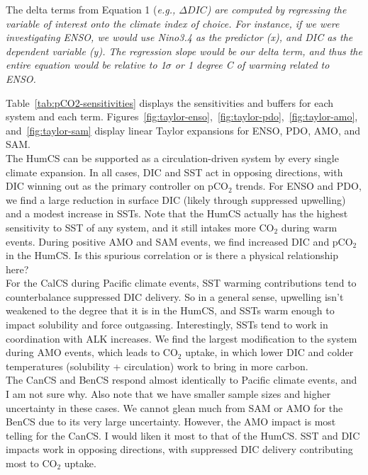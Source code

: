 \documentclass[12pt]{article}
\begin{document}
\vspace{0.5cm}
The delta terms from Equation 1 (\it e.g.\rm, $\Delta DIC$) are computed by regressing the variable of interest onto the climate index of choice. For instance, if we were investigating ENSO, we would use Nino3.4 as the predictor (x), and DIC as the dependent variable (y). The regression slope would be our delta term, and thus the entire equation would be relative to 1$\sigma$ or 1 degree C of warming related to ENSO.

\newpage
Table~\ref{tab:pCO2-sensitivities} displays the sensitivities and buffers for each system and each term. Figures~\ref{fig:taylor-enso},~\ref{fig:taylor-pdo},~\ref{fig:taylor-amo}, and~\ref{fig:taylor-sam} display linear Taylor expansions for ENSO, PDO, AMO, and SAM.  \\

The HumCS can be supported as a circulation-driven system by every single climate expansion. In all cases, DIC and SST act in opposing directions, with DIC winning out as the primary controller on pCO$_{2}$ trends. For ENSO and PDO, we find a large reduction in surface DIC (likely through suppressed upwelling) and a modest increase in SSTs. Note that the HumCS actually has the highest sensitivity to SST of any system, and it still intakes more CO$_{2}$ during warm events. During positive AMO and SAM events, we find increased DIC and pCO$_{2}$ in the HumCS. Is this spurious correlation or is there a physical relationship here? \\

For the CalCS during Pacific climate events, SST warming contributions tend to counterbalance suppressed DIC delivery. So in a general sense, upwelling isn't weakened to the degree that it is in the HumCS, and SSTs warm enough to impact solubility and force outgassing. Interestingly, SSTs tend to work in coordination with ALK increases. We find the largest modification to the system during AMO events, which leads to CO$_{2}$ uptake, in which lower DIC and colder temperatures (solubility + circulation) work to bring in more carbon. \\

The CanCS and BenCS respond almost identically to Pacific climate events, and I am not sure why. Also note that we have smaller sample sizes and higher uncertainty in these cases. We cannot glean much from SAM or AMO for the BenCS due to its very large uncertainty. However, the AMO impact is most telling for the CanCS. I would liken it most to that of the HumCS. SST and DIC impacts work in opposing directions, with suppressed DIC delivery contributing most to CO$_{2}$ uptake. \\
\end{document}
